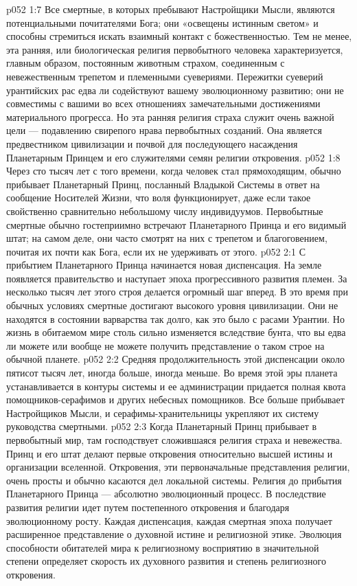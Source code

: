 \vs p052 1:7 Все смертные, в которых пребывают Настройщики Мысли, являются потенциальными почитателями Бога; они «освещены истинным светом» и способны стремиться искать взаимный контакт с божественностью. Тем не менее, эта ранняя, или биологическая религия первобытного человека характеризуется, главным образом, постоянным животным страхом, соединенным с невежественным трепетом и племенными суевериями. Пережитки суеверий урантийских рас едва ли содействуют вашему эволюционному развитию; они не совместимы с вашими во всех отношениях замечательными достижениями материального прогресса. Но эта ранняя религия страха служит очень важной цели --- подавлению свирепого нрава первобытных созданий. Она является предвестником цивилизации и почвой для последующего насаждения Планетарным Принцем и его служителями семян религии откровения.
\vs p052 1:8 \pc Через сто тысяч лет с того времени, когда человек стал прямоходящим, обычно прибывает Планетарный Принц, посланный Владыкой Системы в ответ на сообщение Носителей Жизни, что воля функционирует, даже если такое свойственно сравнительно небольшому числу индивидуумов. Первобытные смертные обычно гостеприимно встречают Планетарного Принца и его видимый штат; на самом деле, они часто смотрят на них с трепетом и благоговением, почитая их почти как Бога, если их не удерживать от этого.
\vs p052 2:1 С прибытием Планетарного Принца начинается новая диспенсация. На земле появляется правительство и наступает эпоха прогрессивного развития племен. За несколько тысяч лет этого строя делается огромный шаг вперед. В это время при обычных условиях смертные достигают высокого уровня цивилизации. Они не находятся в состоянии варварства так долго, как это было с расами Урантии. Но жизнь в обитаемом мире столь сильно изменяется вследствие бунта, что вы едва ли можете или вообще не можете получить представление о таком строе на обычной планете.
\vs p052 2:2 Средняя продолжительность этой диспенсации около пятисот тысяч лет, иногда больше, иногда меньше. Во время этой эры планета устанавливается в контуры системы и ее администрации придается полная квота помощников\hyp{}серафимов и других небесных помощников. Все больше прибывает Настройщиков Мысли, и серафимы\hyp{}хранительницы укрепляют их систему руководства смертными.
\vs p052 2:3 Когда Планетарный Принц прибывает в первобытный мир, там господствует сложившаяся религия страха и невежества. Принц и его штат делают первые откровения относительно высшей истины и организации вселенной. Откровения, эти первоначальные представления религии, очень просты и обычно касаются дел локальной системы. Религия до прибытия Планетарного Принца --- абсолютно эволюционный процесс. В последствие развития религии идет путем постепенного откровения и благодаря эволюционному росту. Каждая диспенсация, каждая смертная эпоха получает расширенное представление о духовной истине и религиозной этике. Эволюция способности обитателей мира к религиозному восприятию в значительной степени определяет скорость их духовного развития и степень религиозного откровения.
